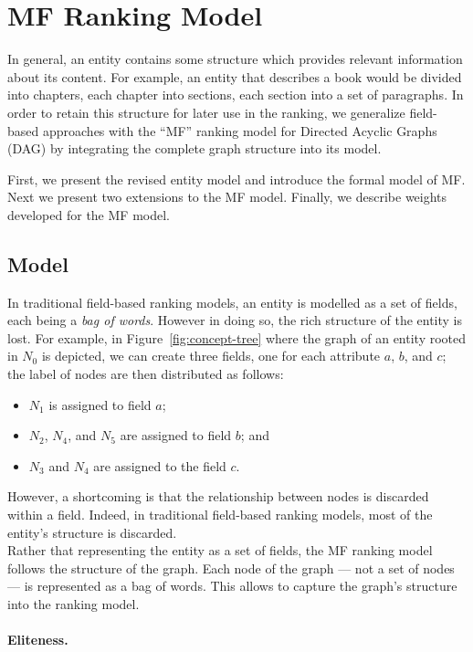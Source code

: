 \section{MF Ranking Model}
\label{chap:tree-ranking:mf-model}

In general, an entity contains some structure which provides relevant information about its content. For example, an entity that describes a book would be divided into chapters, each chapter into sections, each section into a set of paragraphs. In order to retain this structure for later use in the ranking, we generalize field-based approaches with the ``MF'' ranking model for Directed Acyclic Graphs (DAG) by integrating the complete graph structure into its model.

First, we present the revised entity model and introduce the formal model of MF. Next we present two extensions to the MF model. Finally, we describe weights developed for the MF model.

\subsection{Model}

In traditional field-based ranking models, an entity is modelled as a set of fields, each being a \emph{bag of words}. However in doing so, the rich structure of the entity is lost. For example, in Figure~\ref{fig:concept-tree} where the graph of an entity rooted in $N_0$ is depicted, we can create three fields, one for each attribute $a$, $b$, and $c$; the label of nodes are then distributed as follows:
\begin{itemize}
	\item $N_1$ is assigned to field $a$;
	\item $N_2$, $N_4$, and $N_5$ are assigned to field $b$; and
	\item $N_3$ and $N_4$ are assigned to the field $c$.
\end{itemize}
However, a shortcoming is that the relationship between nodes is discarded within a field. Indeed, in traditional field-based ranking models, most of the entity's structure is discarded.\\

Rather that representing the entity as a set of fields, the MF ranking model follows the structure of the graph. Each node of the graph --- not a set of nodes --- is represented as a bag of words. This allows to capture the graph's structure into the ranking model.

\paragraph{Eliteness.}

